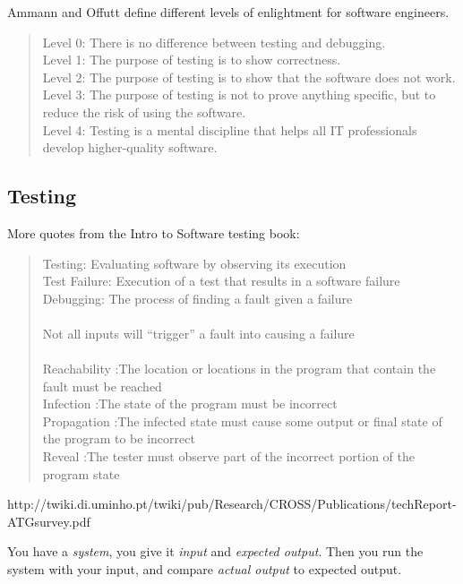 Ammann and Offutt 
define different levels of enlightment for software engineers.

\begin{quote}
Level 0:  There is no difference between testing and debugging. \\
Level 1: The purpose of testing is to show correctness. \\
Level 2: The purpose of testing is to show that the software does not work. \\
Level 3: The purpose of testing is not to prove anything specific, but to reduce the risk of using the software. \\
Level 4: Testing is a mental discipline that helps all IT professionals develop higher-quality software.
\end{quote}



\subsection{Testing}

More quotes from the Intro to Software testing book:

\begin{quote}
Testing: Evaluating software by observing its execution \\
Test Failure: Execution of a test that results in a software failure \\
Debugging: The process of finding a fault given a failure \\
\\
Not all inputs will “trigger” a fault into causing a failure
\\
\\
Reachability :The location or locations in the program that contain the fault must be reached \\
Infection :The state of the program must be incorrect \\
Propagation :The infected state must cause some output or  final state of the program to be incorrect \\
Reveal :The tester must observe part of the incorrect portion of the program state \\
\end{quote}

http://twiki.di.uminho.pt/twiki/pub/Research/CROSS/Publications/techReport-ATGsurvey.pdf

You have a \emph{system}, you give it \emph{input} and 
\emph{expected output}.
Then you run the system with your input, and compare \emph{actual
  output} to expected output.

